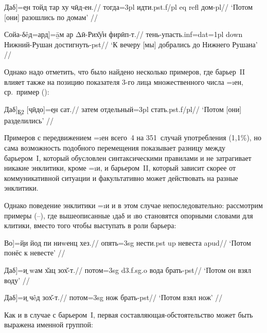 \begingl
\gla {[}Даδ{]}=\b{ен} тойд тар ху чӣд-ен.//
\glc тогда={\sc 3pl} идти.{\sc pst.f/pl} {\sc eq} {\sc refl} дом-{\sc pl}//
\glft ‘Потом [они] разошлись по домам’ //
\endgl \xe

\begingl
\gla {[}Сойа-δêд=ард{]}=\b{āм} ар Δӣ-Рих̌у̊н фирӣп-т.//
\glc тень-упасть.{\sc inf=dat=1pl} {\sc down} Нижний-Рушан достигнуть-{\sc pst}//
\glft ‘К вечеру [мы] добрались до Нижнего Рушана’ //
\endgl \xe

Однако надо отметить, что было найдено несколько примеров, где барьер~II влияет также на позицию показателя 3-го лица множественного числа =\i{ен}, ср.~пример ():

\begingl
\gla {[}Даδ{]}\textsubscript{\b{Б2}} {[}ҷӣдо{]}=\b{ен} сат.//
\glc затем отдельный={\sc 3pl} стать.{\sc pst.f/pl}//
\glft ‘Потом [они] разделились’ //
\endgl \xe

Примеров с передвижением =\i{ен} всего~4 на 351~случай употребления (1,1\%), но сама возможность подобного перемещения показывает разницу между барьером~I, который обусловлен синтаксическими правилами и не затрагивает никакие энклитики, кроме =\i{и}, и барьером~II, который зависит скорее от коммуникативной ситуации и факультативно может действовать на разные энклитики.

Однако поведение энклитики =\i{и} и в этом случае непоследовательно: рассмотрим примеры (–), где вышеописанные \i{даδ} и \i{во} становятся опорными словами для клитики, вместо того чтобы выступать в роли барьера:

\begingl
\gla {[}Во{]}=\b{йи} йод пи ниwенц хез.//
\glc опять={\sc 3sg} нести.{\sc pst} {\sc up} невеста {\sc apud}//
\glft ‘Потом понёс к невесте’ //
\endgl \xe

\begingl
\gla {[}Даδ{]}=\b{и} wам х̌ац зох̌-т.//
\glc потом={\sc 3sg} {\sc d3.f.sg.o} вода брать-{\sc pst}//
\glft ‘Потом он взял воду’ //
\endgl \xe

\begingl
\gla {[}Даδ{]}=\b{и} чêд зох̌-т.//
\glc потом={\sc 3sg} нож брать-{\sc pst}//
\glft ‘Потом взял нож’ //
\endgl \xe

Как и в случае с барьером~I, первая составляющая-обстоятельство может быть выражена именной группой:

